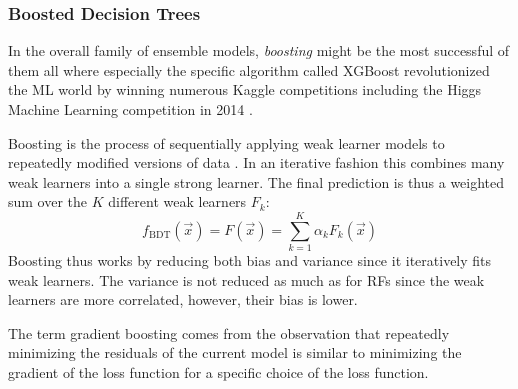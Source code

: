 
\subsubsection{Boosted Decision Trees}
\label{subsubsec:ml:boosted_decision_trees}
In the overall family of ensemble models, \emph{boosting} might be the most successful of them all where especially the specific algorithm called XGBoost \autocite{chenXGBoostScalableTree2016} revolutionized the ML world by winning numerous Kaggle competitions \autocite{DmlcXgboost} including the Higgs Machine Learning competition in \num{2014} \autocite{HEPMeetsML}. 

Boosting is the process of sequentially applying weak learner models to repeatedly modified versions of data \autocite{hastieElementsStatisticalLearning2009}. In an iterative fashion this combines many weak learners into a single strong learner. The final prediction is thus a weighted sum over the $K$ different weak learners $F_k$: 
\begin{equation}
  f_\mathrm{BDT}(\vec{x}) = F(\vec{x}) = \sum_{k=1}^K \alpha_k F_k(\vec{x})
\end{equation}
Boosting thus works by reducing both bias and variance since it iteratively fits weak learners. The variance is not reduced as much as for RFs since the weak learners are more correlated, however, their bias is lower. 

The term gradient boosting comes from the observation that repeatedly minimizing the residuals of the current model is similar to minimizing the gradient of the loss function for a specific choice of the loss function.

